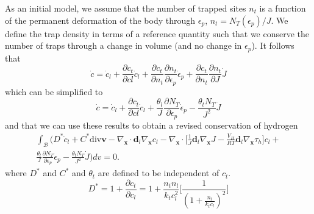 \documentclass[10pt]{elsarticle}
\newcommand{\mbs}[1]{\boldsymbol{#1}}
\def\bs{{\mbs{s}}} \def\bt{{\mbs{t}}} \def\bu{{\mbs{u}}}
\def\bs{\boldsymbol}
\begin{document}
As an initial model, we assume that the number of trapped sites $n_{t}$ is a function of the permanent deformation of the body through $\epsilon_{p}$, $n_{t} = N_{T}(\epsilon_{p})/J$. We define the trap density in terms of a reference quantity such that we conserve the number of traps through a change in volume (and no change in $\epsilon_{p}$).  It follows that
%
\begin{equation}
\label{eq.cdot2}{\dot{c} = \dot{c}_{l} + \frac{\partial c_{t}}{\partial c{l}} \dot{c}_{l} + \frac{\partial c_{t}}{\partial n_{t}} \frac{\partial n_{t}}{\partial \epsilon_{p}} \dot{\epsilon}_{p}} +  \frac{\partial c_{t}}{\partial n_{t}} \frac{\partial n_{t}}{\partial J} \dot{J}
\end{equation}
%
which can be simplified to
%
\begin{equation}
\label{eq.cdot}{\dot{c} = \dot{c}_{l} + \frac{\partial c_{t}}{\partial c{l}} \dot{c}_{l} + \frac{\theta_{l}}{J} \frac{\partial N_{T}}{\partial \epsilon_{p}} \dot{\epsilon}_{p} -  \frac{\theta_{t} N_{T}}{J^{2}}  \dot{J}}
\end{equation}
%
and that we can use these results to obtain a revised conservation of hydrogen
\begin{align}
\label{eq.hconservation4}  \int_{\mathcal{B}} (D^{*}\dot{c}_{l} + C^{*}\text{div}\bs{v} - \nabla_{\bs{x}} \cdot \bs{d}_{l} \nabla_{\bs{x}}c_{l}   -  \nabla_{\bs{x}} \cdot \bigg[ \frac{1}{J} \bs{d}_{l} \nabla_{\bs{x}}J -  \frac{V_{H}}{R T} \bs{d}_{l} \nabla_{\bs{x}}\tau_{h}\bigg] c_{l}  +  \nonumber \\ \frac{\theta_{l}}{J} \frac{\partial N_{T}}{\partial \epsilon_{p}} \dot{\epsilon}_{p} -  \frac{\theta_{t} N_{T}}{J^{2}}  \dot{J} )dv = 0.
\end{align}
where $D^{*}$ and $C^{*}$ and $\theta_{t}$ are defined to be independent of $c_{t}$.
%
\begin{equation}
\label{eq.Dstar}{D^{*} = 1 + \frac{\partial c_{t}}{\partial c_{l}} = 1 + \frac{n_{t} n_{l}}{k_{t} c_{l}^{2}}\bigg[ \frac{1}{(1+ \frac{n_{l}}{k_{t} c_{l}})^{2}}\bigg] }
\end{equation}
\end{document}
